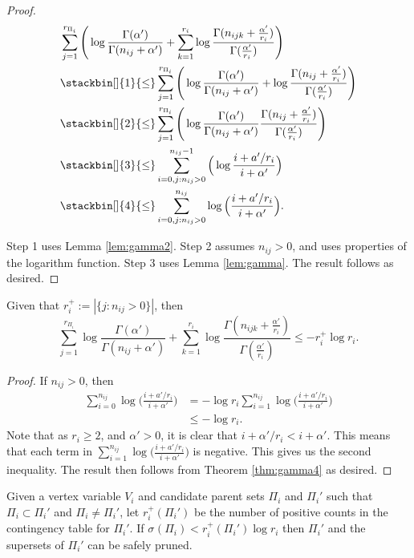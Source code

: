 \documentclass[letterpaper]{article}
\newcommand{\score}[2]{\sigma_{#1}({#2})}
\newenvironment{customcor}[1]
  {\renewcommand\theinnercustomcor{#1}\innercustomcor}
  {\endinnercustomthm}
\begin{document}
\begin{proof}
 \begin{align*}
     &\sum_{j=1}^{r_{\Pi_i}} \Bigg( \log \frac{\Gamma( \alpha')}{\Gamma(n_{ij}+\alpha')} +  \sum_{k=1}^{r_i} \log \frac{\Gamma(n_{ijk} + \frac{\alpha'}{r_i})}{\Gamma( \frac{\alpha'}{r_i})}\Bigg)\\
      &\stackbin[]{1}{\leq} \sum_{j=1}^{r_{\Pi_i}}  \Bigg(\log \frac{\Gamma( \alpha')}{\Gamma(n_{ij}+ \alpha')} + \log \frac{\Gamma(n_{ij} + \frac{\alpha'}{r_i})}{\Gamma( \frac{\alpha'}{r_i})}\Bigg) \\
     &\stackbin[]{2}{\leq} \sum_{j=1}^{r_{\Pi_i}}  \Bigg(\log \frac{\Gamma( \alpha')}{\Gamma(n_{ij}+ \alpha')} \frac{\Gamma(n_{ij} + \frac{\alpha'}{r_i})}{\Gamma( \frac{\alpha'}{r_i})}\Bigg) \\
     & \stackbin[]{3}{\leq} \sum_{i=0, j:n_{ij}>0}^{n_{ij}-1} \Big( \log  \frac{i+ a'/r_i}{i+\alpha'}\Big)  \\
     &\stackbin[]{4}{\leq} \sum_{i=0, j:n_{ij}>0}^{n_{ij}} \log \Big( \frac{i+ a'/r_i}{i+\alpha'}\Big).
\end{align*}

Step 1 uses Lemma \ref{lem:gamma2}. Step 2 assumes $n_{ij} > 0$, and uses properties of the logarithm function. Step 3 uses Lemma \ref{lem:gamma}. The result follows as desired.
\end{proof}
\begin{customcor}{6D}
\cite{cussens2015gobnilp} Given that $r_i^{+} := |\{j: n_{ij} > 0\}|$, then 
\begin{equation*}
         \sum_{j=1}^{r_{\Pi_i}} \log \frac{\Gamma( \alpha')}{\Gamma(n_{ij} + \alpha')} +  \sum_{k=1}^{r_i} \log \frac{\Gamma(n_{ijk} + \frac{\alpha'}{r_i})}{\Gamma( \frac{\alpha'}{r_i})}  \leq -r_i^{+} \log r_i.
\end{equation*}
\label{cor:gamma3}
\end{customcor}

\begin{proof}
 If $n_{ij} > 0$, then 
 \begin{align*}
     \sum_{i=0}^{n_{ij}} \log \Big( \frac{i+ a'/r_i}{i+\alpha'}\Big) &= - \log r_i \sum_{i=1}^{n_{ij}} \log \Big( \frac{i+ a'/r_i}{i+\alpha'}\Big)\\
     &\leq -\log r_i.
 \end{align*}
Note that as $r_i \geq 2$, and $\alpha' > 0$, it is clear that $i + \alpha'/r_i < i+ \alpha'$. This means that each term in $\sum_{i=1}^{n_{ij}} \log \Big( \frac{i+ a'/r_i}{i+\alpha'}\Big)$ is negative.  This gives us the second inequality. The result then follows from Theorem \ref{thm:gamma4} as desired.
\end{proof}
\begin{customcor}{6E}
\cite{cussens2015gobnilp}
Given a vertex variable $V_i$ and candidate parent sets $\Pi_i$ and $\Pi_i'$
such that $\Pi_i \subset \Pi_i'$ and $\Pi_i \neq \Pi_i'$, let
$r_i^{+}(\Pi_i')$ be the number of positive counts in the contingency table for $\Pi_i'$. If $\score{}{\Pi_i} < r_i^{+}(\Pi_i') \log r_i$ then $\Pi_i'$ and the supersets of $\Pi_i'$ can be safely pruned.
\end{customcor}
\end{document}

